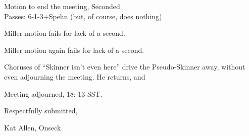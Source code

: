 \documentclass[12pt]{article}
\begin{document}
Motion to end the meeting, Seconded\\
Passes: 6-1-3+Spehn (but, of course, does nothing)

Miller motion fails for lack of a second.

Miller motion again fails for lack of a second.

Choruses of ``Skinner isn't even here'' drive the Pseudo-Skinner away,
without even adjourning the meeting. He returns, and 

\vspace{12pt}

\noindent
Meeting adjourned, 18:-13 SST.

\vspace{18pt}

\centerline{Respectfully submitted,}
\centerline{Kat Allen,  Onseck}
\end{document}
